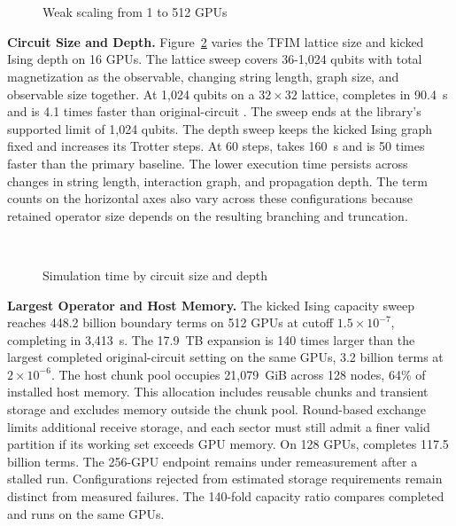 \begin{figure}[t]
\centering
{}\\[-2pt]
\hfill
{}\hfill
{}\\
\hfill
{}\hfill
{}
\caption{Weak scaling from 1 to 512 GPUs}
\label{fig:weak}
\end{figure}

\noindent\textbf{Circuit Size and Depth.}
Figure~\ref{fig:size} varies the TFIM lattice size and kicked Ising depth on 16 GPUs.
The lattice sweep covers 36-1,024 qubits with total magnetization as the observable, changing string length, graph size, and observable size together.
At 1,024 qubits on a $32\times32$ lattice, \SectorQ completes in 90.4~s and is 4.1 times faster than original-circuit \cuPP.
The sweep ends at the library's supported limit of 1,024 qubits.
The depth sweep keeps the kicked Ising graph fixed and increases its Trotter steps.
At 60 steps, \SectorQ takes 160~s and is 50 times faster than the primary baseline.
The lower execution time persists across changes in string length, interaction graph, and propagation depth.
The term counts on the horizontal axes also vary across these configurations because retained operator size depends on the resulting branching and truncation.

\begin{figure}[t]
\centering
{}\\[-2pt]
\hfill
{}\hfill
{}
\caption{Simulation time by circuit size and depth}
\label{fig:size}
\end{figure}

\noindent\textbf{Largest Operator and Host Memory.}
The kicked Ising capacity sweep reaches 448.2 billion boundary terms on 512 GPUs at cutoff $1.5\times10^{-7}$, completing in 3,413~s.
The 17.9~TB expansion is 140 times larger than the largest completed original-circuit \cuPP setting on the same GPUs, 3.2 billion terms at $2\times10^{-6}$.
The host chunk pool occupies 21,079~GiB across 128 nodes, 64\% of installed host memory.
This allocation includes reusable chunks and transient storage and excludes memory outside the chunk pool.
Round-based exchange limits additional receive storage, and each sector must still admit a finer valid partition if its working set exceeds GPU memory.
On 128 GPUs, \SectorQ completes 117.5 billion terms.
The 256-GPU endpoint remains under remeasurement after a stalled run.
Configurations rejected from estimated storage requirements remain distinct from measured failures.
The 140-fold capacity ratio compares completed \SectorQ and \cuPP runs on the same GPUs.

